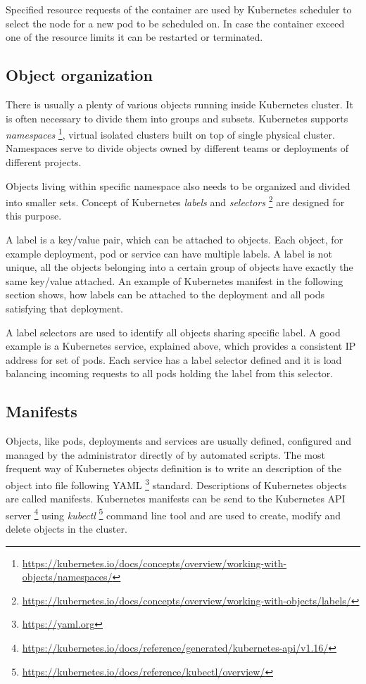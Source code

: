 \documentclass[
  digital, %
  twoside, %
  table,   %
  lof,     %
  lot,     %
]{fithesis3}
\begin{document}
Specified resource requests of the container are used by Kubernetes scheduler to select the node for a new pod to be scheduled on. In case the container exceed one of the resource limits it can be restarted or terminated.

\subsection{Object organization} \label{sec:obj_organization}
There is usually a plenty of various objects running inside Kubernetes cluster. It is often necessary to divide them into groups and subsets. Kubernetes supports \textit{namespaces} \footnote{\url{https://kubernetes.io/docs/concepts/overview/working-with-objects/namespaces/}}, virtual isolated clusters built on top of single physical cluster. Namespaces serve to divide objects owned by different teams or deployments of different projects.

Objects living within specific namespace also needs to be organized and divided into smaller sets. Concept of Kubernetes \textit{labels} and \textit{selectors} \footnote{\url{https://kubernetes.io/docs/concepts/overview/working-with-objects/labels/}} are designed for this purpose.

A label is a key/value pair, which can be attached to objects. Each object, for example deployment, pod or service can have multiple labels. A label is not unique, all the objects belonging into a certain group of objects have exactly the same key/value attached. An example of Kubernetes manifest in the following section shows, how labels can be attached to the deployment and all pods satisfying that deployment.

A label selectors are used to identify all objects sharing specific label. A good example is a Kubernetes service, explained above, which provides a consistent IP address for set of pods. Each service has a label selector defined and it is load balancing incoming requests to all pods holding the label from this selector.

\subsection{Manifests} \label{sec:manifest}
Objects, like pods, deployments and services are usually defined, configured and managed by the administrator directly of by automated scripts. The most frequent way of Kubernetes objects definition is to write an description of the object into file following YAML \footnote{\url{https://yaml.org}} standard. Descriptions of Kubernetes objects are called manifests. Kubernetes manifests can be send to the Kubernetes API server \footnote{\url{https://kubernetes.io/docs/reference/generated/kubernetes-api/v1.16/}} using \textit{kubectl} \footnote{\url{https://kubernetes.io/docs/reference/kubectl/overview/}} command line tool and are used to create, modify and delete objects in the cluster.
\end{document}
